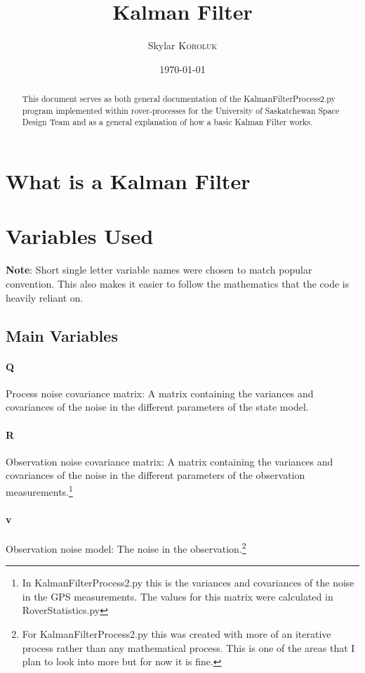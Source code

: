 \documentclass{article}
\title{Kalman Filter} %
\author{Skylar \textsc{Koroluk}} %
\date{\today} %
\begin{document}
\maketitle %

\begin{abstract}
This document serves as both general documentation of the KalmanFilterProcess2.py program implemented within rover-processes for the University of Saskatchewan Space Design Team and as a general explanation of how a basic Kalman Filter works.
\end{abstract}

\tableofcontents

\section{What is a Kalman Filter}
\section{Variables Used}
\textbf{Note}: Short single letter variable names were chosen to match popular convention. This also makes it easier to follow the mathematics that the code is heavily reliant on. 
\subsection{Main Variables}
\paragraph{Q}
Process noise covariance matrix: A matrix containing the variances and covariances of the noise in the different parameters of the state model.
\paragraph{R}
Observation noise covariance matrix: A matrix containing the variances and covariances of the noise in the different parameters of the observation measurements.\footnote{In KalmanFilterProcess2.py this is the variances and covariances of the noise in the GPS measurements. The values for this matrix were calculated in RoverStatistics.py}
\paragraph{v}
Observation noise model: The noise in the observation.\footnote{For KalmanFilterProcess2.py this was created with more of an iterative process rather than any mathematical process. This is one of the areas that I plan to look into more but for now it is fine.}
\end{document}
